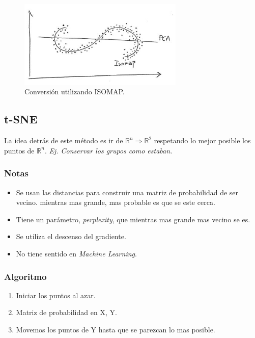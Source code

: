 \documentclass[titlepage,a4paper]{article}
\begin{document}
\begin{figure}[!htb]
    \centering
    \includegraphics[width=0.7\textwidth]{imagenesResumen/ISOMAP.jpeg}
    \caption{Conversión utilizando ISOMAP.}
\end{figure}

\newpage

\subsection{t-SNE}

La idea detrás de este método es ir de $\mathbb{R}^{n} \Rightarrow \mathbb{R}^{2}$ respetando lo mejor posible los puntos de $\mathbb{R}^{n}$. \textit{Ej. Conservar los grupos como estaban.}

\subsubsection*{Notas}
\begin{itemize}
    \item Se usan las distancias para construir una matriz de probabilidad de ser vecino. mientras mas grande, mas probable es que se este cerca.

    \item Tiene un parámetro, \textit{perplexity}, que mientras mas grande mas vecino se es.
    
    \item Se utiliza el descenso del gradiente.
    
    \item No tiene sentido en \textit{Machine Learning}.
\end{itemize}

\subsubsection*{Algoritmo}
\begin{enumerate}
    \item Iniciar los puntos al azar.
    \item Matriz de probabilidad en X, Y.
    \item Movemos los puntos de Y hasta que se parezcan lo mas posible.
\end{enumerate}
\end{document}
